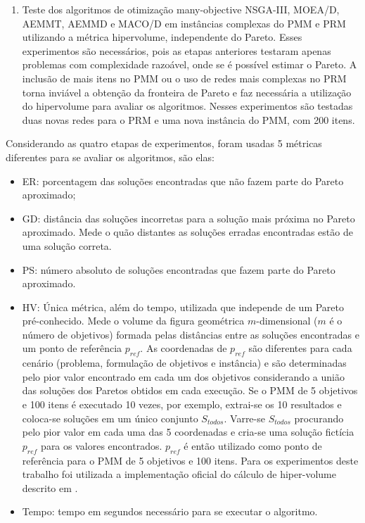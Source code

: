 \begin{enumerate}
	\item Teste dos algoritmos de otimização many-objective NSGA-III, MOEA/D, AEMMT, AEMMD e MACO/D em instâncias complexas do PMM e PRM utilizando a métrica hipervolume, independente do Pareto. Esses experimentos são necessários, pois as etapas anteriores testaram apenas problemas com complexidade razoável, onde se é possível estimar o Pareto. A inclusão de mais itens no PMM ou o uso de redes mais complexas no PRM torna inviável a obtenção da fronteira de Pareto e faz necessária a utilização do hipervolume para avaliar os algoritmos. Nesses experimentos são testadas duas novas redes para o PRM e uma nova instância do PMM, com 200 itens.
\end{enumerate}

Considerando as quatro etapas de experimentos, foram usadas 5 métricas diferentes para se avaliar os algoritmos, são elas:

\begin{itemize}
	\item \ac{ER}: porcentagem das soluções encontradas que não fazem parte do Pareto aproximado;
	\item \ac{GD}: distância das soluções incorretas para a solução mais próxima no Pareto aproximado. Mede o quão distantes as soluções erradas encontradas estão de uma solução correta.
	\item \ac{PS}: número absoluto de soluções encontradas que fazem parte do Pareto aproximado.
	\item \ac{HV}: Única métrica, além do tempo, utilizada que independe de um Pareto pré-conhecido. Mede o volume da figura geométrica $m$-dimensional ($m$ é o número de objetivos) formada pelas distâncias entre as soluções encontradas e um ponto de referência $p_{ref}$. As coordenadas de $p_{ref}$ são diferentes para cada cenário (problema, formulação de objetivos e instância) e são determinadas pelo pior valor encontrado em cada um dos objetivos considerando a união das soluções dos Paretos obtidos em cada execução. Se o PMM de 5 objetivos e 100 itens é executado 10 vezes, por exemplo, extrai-se os 10 resultados e coloca-se soluções em um único conjunto $S_{todos}$. Varre-se $S_{todos}$ procurando pelo pior valor em cada uma das 5 coordenadas e cria-se uma solução fictícia $p_{ref}$ para os valores encontrados. $p_{ref}$ é então utilizado como ponto de referência para o PMM de 5 objetivos e 100 itens. Para os experimentos deste trabalho foi utilizada a implementação oficial do cálculo de hiper-volume descrito em \cite{Bradstreet2012}.
	\item Tempo: tempo em segundos necessário para se executar o algoritmo.
\end{itemize}

